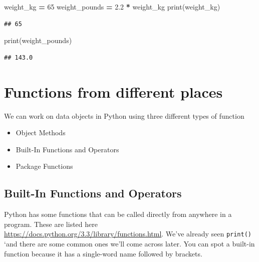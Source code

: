 \documentclass[]{book}
\newenvironment{Shaded}{\begin{snugshade}}{\end{snugshade}}
\newcommand{\BuiltInTok}[1]{#1}
\newcommand{\DecValTok}[1]{\textcolor[rgb]{0.00,0.00,0.81}{#1}}
\newcommand{\FloatTok}[1]{\textcolor[rgb]{0.00,0.00,0.81}{#1}}
\newcommand{\NormalTok}[1]{#1}
\newcommand{\OperatorTok}[1]{\textcolor[rgb]{0.81,0.36,0.00}{\textbf{#1}}}
\providecommand{\tightlist}{%
  \setlength{\itemsep}{0pt}\setlength{\parskip}{0pt}}
\theoremstyle{definition}
\theoremstyle{definition}
\theoremstyle{definition}
\theoremstyle{remark}
\begin{document}
\begin{Shaded}
\begin{Highlighting}[]
\NormalTok{weight_kg }\OperatorTok{=} \DecValTok{65}
\NormalTok{weight_pounds }\OperatorTok{=} \FloatTok{2.2} \OperatorTok{*}\NormalTok{ weight_kg}
\BuiltInTok{print}\NormalTok{(weight_kg)}
\end{Highlighting}
\end{Shaded}

\begin{verbatim}
## 65
\end{verbatim}

\begin{Shaded}
\begin{Highlighting}[]
\BuiltInTok{print}\NormalTok{(weight_pounds)}
\end{Highlighting}
\end{Shaded}

\begin{verbatim}
## 143.0
\end{verbatim}

\hypertarget{functions-from-different-places}{%
\section{Functions from different
places}\label{functions-from-different-places}}

We can work on data objects in Python using three different types of
function

\begin{itemize}
\tightlist
\item
  Object Methods
\item
  Built-In Functions and Operators
\item
  Package Functions
\end{itemize}

\hypertarget{built-in-functions-and-operators}{%
\subsection{Built-In Functions and
Operators}\label{built-in-functions-and-operators}}

Python has some functions that can be called directly from anywhere in a
program. These are listed here
\href{}{https://docs.python.org/3.3/library/functions.html}. We've
already seen \texttt{print()} `and there are some common ones we'll come
across later. You can spot a built-in function because it has a
single-word name followed by brackets.
\end{document}
